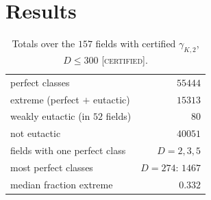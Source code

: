 \documentclass[11pt]{amsart}
\theoremstyle{definition}
\theoremstyle{remark}
\newcommand{\gK}{\gamma_{K,2}}
\newcommand{\CERT}{\textsc{[certified]}}
\begin{document}
\section{Results}\label{sec:results}

\begin{table}[ht]
\caption{Totals over the $157$ fields with certified $\gK$, $D\le300$ \CERT.}\label{tab:counts}
\begin{tabular}{lr}
\toprule
perfect classes & $55444$\\
\quad extreme (perfect $+$ eutactic) & $15313$\\
\quad weakly eutactic (in $52$ fields) & $80$\\
\quad not eutactic & $40051$\\
fields with one perfect class & $D=2,3,5$\\
most perfect classes & $D=274$: $1467$\\
median fraction extreme & $0.332$\\
\bottomrule
\end{tabular}
\end{table}
\end{document}
